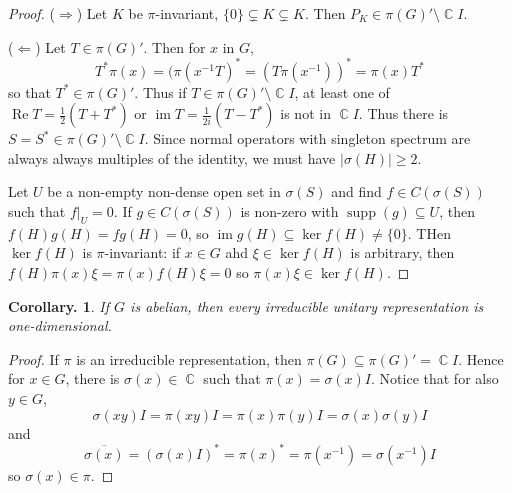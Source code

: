 \documentclass[11pt, a4paper]{memoir}
\DeclareMathOperator{\C}{{\mathbb{C}}}
\newcommand{\impr}{{($\Longrightarrow$)\hspace{0.2cm}}}
\newcommand{\impl}{{($\Longleftarrow$)\hspace{0.2cm}}}
\theoremstyle{change}
\newtheorem{corollary}[theorem]{Corollary.}
\theoremstyle{plain}
\theoremstyle{nonumberplain}
\newtheorem{proof}{Proof}
\DeclareMathOperator{\im}{im}
\DeclareMathOperator{\supp}{supp}
\renewcommand{\Re}{\ensuremath{\operatorname{Re}}}
\numberwithin{equation}{section}
\begin{document}
\begin{proof}
    \impr
    Let $K$ be $\pi$-invariant, $\{0\}\subsetneq K\subsetneq K$.
    Then $P_K\in\pi(G)'\setminus \C I$.

    \impl
    Let $T\in\pi(G)'$.
    Then for $x$ in $G$,
    \begin{equation*}
        T^*\pi(x) = (\pi(x^{-1}T)^*=(T\pi(x^{-1}))^*=\pi(x)T^*
    \end{equation*}
    so that $T^*\in\pi(G)'$.
    Thus if $T\in\pi(G)'\setminus \C I$, at least one of $\Re T=\frac{1}{2}(T+T^*)$ or $\im T=\frac{1}{2i}(T-T^*)$ is not in $\C I$.
    Thus there is $S=S^*\in\pi(G)'\setminus\C I$.
    Since normal operators with singleton spectrum are always always multiples of the identity, we must have $|\sigma(H)|\geq 2$.

    Let $U$ be a non-empty non-dense open set in $\sigma(S)$ and find $f\in C(\sigma(S))$ such that $f|_U=0$.
    If $g\in C(\sigma(S))$ is non-zero with $\supp(g)\subseteq U$, then$f(H)g(H)=fg(H)=0$, so $\im g(H)\subseteq\ker f(H)\neq\{0\}$.
    THen $\ker f(H)$ is $\pi$-invariant: if $x\in G$ ahd $\xi\in\ker f(H)$ is arbitrary, then $f(H)\pi(x)\xi=\pi(x)f(H)\xi=0$ so $\pi(x)\xi\in\ker f(H)$.

\end{proof}
\begin{corollary}
    If $G$ is abelian, then every irreducible unitary representation is one-dimensional.
\end{corollary}
\begin{proof}
    If $\pi$ is an irreducible representation, then $\pi(G)\subseteq\pi(G)'=\C I$.
    Hence for $x\in G$, there is $\sigma(x)\in\C$ such that $\pi(x)=\sigma(x) I$.
    Notice that for also $y\in G$,
    \begin{equation*}
        \sigma(xy)I=\pi(xy)I=\pi(x)\pi(y)I=\sigma(x)\sigma(y)I
    \end{equation*}
    and
    \begin{equation*}
        \overline{\sigma(x)}=(\sigma(x)I)^*=\pi(x)^*=\pi(x^{-1})=\sigma(x^{-1})I
    \end{equation*}
    so $\sigma(x)\in\pi$.
\end{proof}
\end{document}
